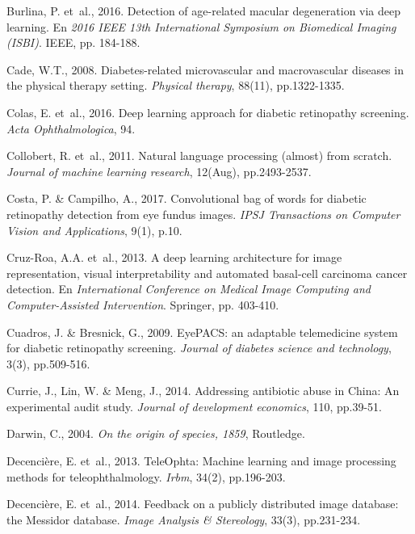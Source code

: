 \documentclass[
  12pt,
  spanish,
  a4paperpaper,
]{report}
\begin{document}
\leavevmode\hypertarget{ref-burlina2016detection}{}%
Burlina, P. et~al., 2016. Detection of age-related macular degeneration
via deep learning. En \emph{2016 IEEE 13th International Symposium on
Biomedical Imaging (ISBI)}. IEEE, pp. 184-188.

\leavevmode\hypertarget{ref-cade2008diabetes}{}%
Cade, W.T., 2008. Diabetes-related microvascular and macrovascular
diseases in the physical therapy setting. \emph{Physical therapy},
88(11), pp.1322-1335.

\leavevmode\hypertarget{ref-colas2016deep}{}%
Colas, E. et~al., 2016. Deep learning approach for diabetic retinopathy
screening. \emph{Acta Ophthalmologica}, 94.

\leavevmode\hypertarget{ref-collobert2011natural}{}%
Collobert, R. et~al., 2011. Natural language processing (almost) from
scratch. \emph{Journal of machine learning research}, 12(Aug),
pp.2493-2537.

\leavevmode\hypertarget{ref-costa2017convolutional}{}%
Costa, P. \& Campilho, A., 2017. Convolutional bag of words for diabetic
retinopathy detection from eye fundus images. \emph{IPSJ Transactions on
Computer Vision and Applications}, 9(1), p.10.

\leavevmode\hypertarget{ref-cruz2013deep}{}%
Cruz-Roa, A.A. et~al., 2013. A deep learning architecture for image
representation, visual interpretability and automated basal-cell
carcinoma cancer detection. En \emph{International Conference on Medical
Image Computing and Computer-Assisted Intervention}. Springer, pp.
403-410.

\leavevmode\hypertarget{ref-cuadros2009eyepacs}{}%
Cuadros, J. \& Bresnick, G., 2009. EyePACS: an adaptable telemedicine
system for diabetic retinopathy screening. \emph{Journal of diabetes
science and technology}, 3(3), pp.509-516.

\leavevmode\hypertarget{ref-currie2014addressing}{}%
Currie, J., Lin, W. \& Meng, J., 2014. Addressing antibiotic abuse in
China: An experimental audit study. \emph{Journal of development
economics}, 110, pp.39-51.

\leavevmode\hypertarget{ref-darwin2004origin}{}%
Darwin, C., 2004. \emph{On the origin of species, 1859}, Routledge.

\leavevmode\hypertarget{ref-decenciere2013teleophta}{}%
Decencière, E. et~al., 2013. TeleOphta: Machine learning and image
processing methods for teleophthalmology. \emph{Irbm}, 34(2),
pp.196-203.

\leavevmode\hypertarget{ref-decenciere2014feedback}{}%
Decencière, E. et~al., 2014. Feedback on a publicly distributed image
database: the Messidor database. \emph{Image Analysis \& Stereology},
33(3), pp.231-234.
\end{document}
